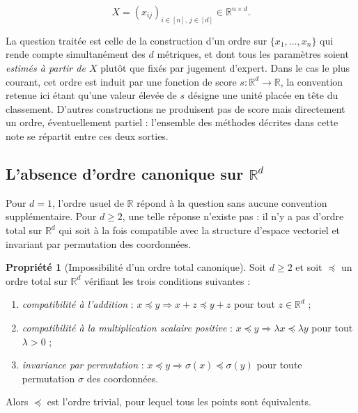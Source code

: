 \documentclass[11pt,a4paper]{article}
\theoremstyle{definition}
\newtheorem{propriete}{Propriété}[section]
\theoremstyle{remark}
\newcommand{\R}{\mathbb{R}}
\begin{document}
\medskip

\[
X = (x_{ij})_{i \in [n],\, j \in [d]} \in \R^{n \times d}.
\]

\bigskip

La question traitée est celle de la construction d'un ordre sur $\{x_1,\dots,x_n\}$ qui
rende compte simultanément des $d$ métriques, et dont tous les paramètres soient
\emph{estimés à partir de $X$} plutôt que fixés par jugement d'expert. Dans le cas le
plus courant, cet ordre est induit par une fonction de score $s : \R^d \to \R$, la
convention retenue ici étant qu'une valeur élevée de $s$ désigne une unité placée en tête
du classement. D'autres constructions ne produisent pas de score mais directement un ordre,
éventuellement partiel : l'ensemble des méthodes décrites dans cette note se répartit
entre ces deux sorties.

\bigskip

\subsection{L'absence d'ordre canonique sur \texorpdfstring{$\R^d$}{R\textasciicircum d}}

\medskip

Pour $d = 1$, l'ordre usuel de $\R$ répond à la question sans aucune convention
supplémentaire. Pour $d \ge 2$, une telle réponse n'existe pas : il n'y a pas d'ordre
total sur $\R^d$ qui soit à la fois compatible avec la structure d'espace vectoriel et
invariant par permutation des coordonnées.

\medskip

\begin{propriete}[Impossibilité d'un ordre total canonique]
  \label{prop:impossibilite}
  Soit $d \ge 2$ et soit $\preceq$ un ordre total sur $\R^d$ vérifiant les trois
  conditions suivantes :

  \medskip

  \begin{enumerate}[nosep,leftmargin=1.8em]
    \item \emph{compatibilité à l'addition} : $x \preceq y \Rightarrow x + z \preceq y + z$
    pour tout $z \in \R^d$ ;
    \item \emph{compatibilité à la multiplication scalaire positive} :
    $x \preceq y \Rightarrow \lambda x \preceq \lambda y$ pour tout $\lambda > 0$ ;
    \item \emph{invariance par permutation} : $x \preceq y \Rightarrow
    \sigma(x) \preceq \sigma(y)$ pour toute permutation $\sigma$ des coordonnées.
  \end{enumerate}

  \bigskip

  Alors $\preceq$ est l'ordre trivial, pour lequel tous les points sont équivalents.
\end{propriete}
\end{document}
